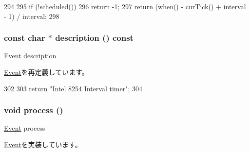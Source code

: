 \begin{DoxyCode}
294 {
295     if (!scheduled())
296         return -1;
297     return (when() - curTick() + interval - 1) / interval;
298 }
\end{DoxyCode}
\hypertarget{classIntel8254Timer_1_1Counter_1_1CounterEvent_a5a14fe478e2393ff51f02e9b7be27e00}{
\subsubsection[{description}]{\setlength{\rightskip}{0pt plus 5cm}const char $\ast$ description () const}}
\label{classIntel8254Timer_1_1Counter_1_1CounterEvent_a5a14fe478e2393ff51f02e9b7be27e00}
\hyperlink{classEvent}{Event} description 

\hyperlink{classEvent_a130ddddf003422b413e2e891b1b80e8f}{Event}を再定義しています。


\begin{DoxyCode}
302 {
303     return "Intel 8254 Interval timer";
304 }
\end{DoxyCode}
\hypertarget{classIntel8254Timer_1_1Counter_1_1CounterEvent_a2e9c5136d19b1a95fc427e0852deab5c}{
\subsubsection[{process}]{\setlength{\rightskip}{0pt plus 5cm}void process ()}}
\label{classIntel8254Timer_1_1Counter_1_1CounterEvent_a2e9c5136d19b1a95fc427e0852deab5c}
\hyperlink{classEvent}{Event} process 

\hyperlink{classEvent_a142b75b68a6291400e20fb0dd905b1c8}{Event}を実装しています。


